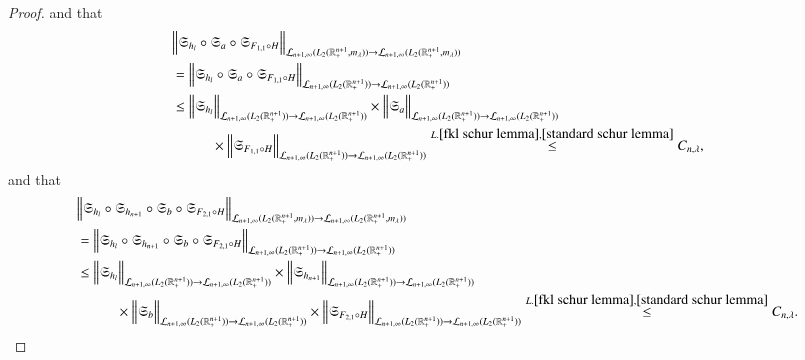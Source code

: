 \documentclass{amsart}
\begin{document}
\begin{proof}
and that
\begin{align*}
&\Big\|\mathfrak{S}_{h_l}\circ\mathfrak{S}_a\circ\mathfrak{S}_{F_{1,1}\circ H}\Big\|_{\mathcal{L}_{n+1,\infty}(L_2(\mathbb{R}^{n+1}_+,m_{\lambda}))\to \mathcal{L}_{n+1,\infty}(L_2(\mathbb{R}^{n+1}_+,m_{\lambda}))}\\
&=\Big\|\mathfrak{S}_{h_l}\circ\mathfrak{S}_a\circ\mathfrak{S}_{F_{1,1}\circ H}\Big\|_{\mathcal{L}_{n+1,\infty}(L_2(\mathbb{R}^{n+1}_+))\to \mathcal{L}_{n+1,\infty}(L_2(\mathbb{R}^{n+1}_+))}\\
&\leq \Big\|\mathfrak{S}_{h_l}\Big\|_{\mathcal{L}_{n+1,\infty}(L_2(\mathbb{R}^{n+1}_+))\to \mathcal{L}_{n+1,\infty}(L_2(\mathbb{R}^{n+1}_+))}\times \Big\|\mathfrak{S}_a\Big\|_{\mathcal{L}_{n+1,\infty}(L_2(\mathbb{R}^{n+1}_+))\to \mathcal{L}_{n+1,\infty}(L_2(\mathbb{R}^{n+1}_+))}\\
&\hspace{1.0cm}\times \Big\|\mathfrak{S}_{F_{1,1}\circ H}\Big\|_{\mathcal{L}_{n+1,\infty}(L_2(\mathbb{R}^{n+1}_+))\to \mathcal{L}_{n+1,\infty}(L_2(\mathbb{R}^{n+1}_+))}\stackrel{L.\ref{fkl schur lemma},\ref{standard schur lemma}}{\leq}{C_{n,\lambda}},
\end{align*}
and that
\begin{align*}
&\Big\|\mathfrak{S}_{h_l}\circ\mathfrak{S}_{h_{n+1}}\circ\mathfrak{S}_b\circ\mathfrak{S}_{F_{2,1}\circ H}\Big\|_{\mathcal{L}_{n+1,\infty}(L_2(\mathbb{R}^{n+1}_+,m_{\lambda}))\to \mathcal{L}_{n+1,\infty}(L_2(\mathbb{R}^{n+1}_+,m_{\lambda}))}\\
&=\Big\|\mathfrak{S}_{h_l}\circ\mathfrak{S}_{h_{n+1}}\circ\mathfrak{S}_b\circ\mathfrak{S}_{F_{2,1}\circ H}\Big\|_{\mathcal{L}_{n+1,\infty}(L_2(\mathbb{R}^{n+1}_+))\to \mathcal{L}_{n+1,\infty}(L_2(\mathbb{R}^{n+1}_+))}\\
&\leq \Big\|\mathfrak{S}_{h_l}\Big\|_{\mathcal{L}_{n+1,\infty}(L_2(\mathbb{R}^{n+1}_+))\to \mathcal{L}_{n+1,\infty}(L_2(\mathbb{R}^{n+1}_+))}\times \Big\|\mathfrak{S}_{h_{n+1}}\Big\|_{\mathcal{L}_{n+1,\infty}(L_2(\mathbb{R}^{n+1}_+))\to \mathcal{L}_{n+1,\infty}(L_2(\mathbb{R}^{n+1}_+))}\\
&\hspace{1.0cm}\times\Big\|\mathfrak{S}_b\Big\|_{\mathcal{L}_{n+1,\infty}(L_2(\mathbb{R}^{n+1}_+))\to \mathcal{L}_{n+1,\infty}(L_2(\mathbb{R}^{n+1}_+))}\times \Big\|\mathfrak{S}_{F_{2,1}\circ H}\Big\|_{\mathcal{L}_{n+1,\infty}(L_2(\mathbb{R}^{n+1}_+))\to \mathcal{L}_{n+1,\infty}(L_2(\mathbb{R}^{n+1}_+))}\stackrel{L.\ref{fkl schur lemma},\ref{standard schur lemma}}{\leq}{C_{n,\lambda}}.
\end{align*}

\end{proof}
\end{document}
